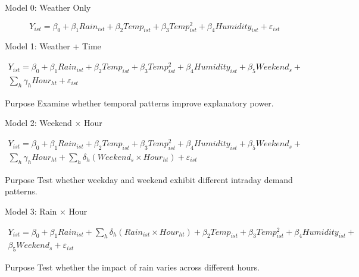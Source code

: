\documentclass[aspectratio=169]{beamer}
\begin{document}
\begin{frame}{Model 0: Weather Only}

\[
Y_{ist}
=
\beta_0
+
\beta_1 Rain_{ist}
+
\beta_2 Temp_{ist}
+
\beta_3 Temp_{ist}^{2}
+
\beta_4 Humidity_{ist}
+
\varepsilon_{ist}
\]


\end{frame}
%
\begin{frame}{Model 1: Weather + Time}

\[
\begin{aligned}
Y_{ist}
=
\beta_0
+
\beta_1 Rain_{ist}
+
\beta_2 Temp_{ist}
+
\beta_3 Temp_{ist}^{2}
+
\beta_4 Humidity_{ist}
+
\beta_5 Weekend_s
+ \\
\sum_{h}
\gamma_h Hour_{ht}
+
\varepsilon_{ist}
\end{aligned}
\]

\begin{block}{Purpose}
Examine whether temporal patterns improve explanatory power.
\end{block}

\end{frame}
%
\begin{frame}{Model 2: Weekend $\times$ Hour}

\[
\begin{aligned}
Y_{ist}
=
\beta_0
+
\beta_1 Rain_{ist}
+
\beta_2 Temp_{ist}
+
\beta_3 Temp_{ist}^{2}
+
\beta_4 Humidity_{ist}
+
\beta_5 Weekend_s
+ \\
\sum_h \gamma_h Hour_{ht}
+
\sum_h \delta_h
(Weekend_s \times Hour_{ht})
+
\varepsilon_{ist}
\end{aligned}
\]

\begin{block}{Purpose}
Test whether weekday and weekend exhibit different intraday demand patterns.
\end{block}

\end{frame}
%
\begin{frame}{Model 3: Rain $\times$ Hour}

\[
\begin{aligned}
Y_{ist}
=
\beta_0
+
\beta_1 Rain_{ist}
+
\sum_h \delta_h
(Rain_{ist}\times Hour_{ht})
+
\beta_2 Temp_{ist}
+
\beta_3 Temp_{ist}^{2}
+
\beta_4 Humidity_{ist}
+ \\
\beta_5 Weekend_s
+
\varepsilon_{ist}
\end{aligned}
\]

\begin{block}{Purpose}
Test whether the impact of rain varies across different hours.
\end{block}

\end{frame}
\end{document}
